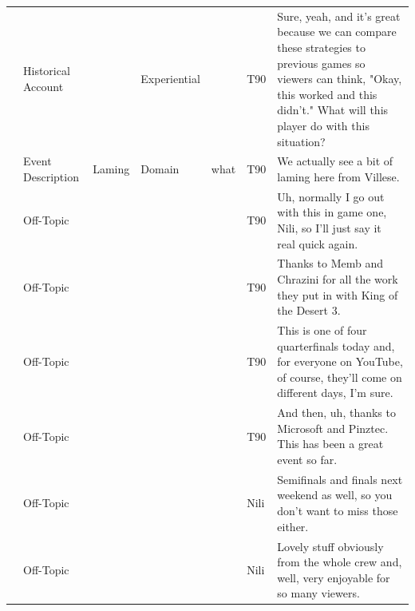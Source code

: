 {\begin{longtable}{@{}>{\theAppRow}r|L{2.3cm}L{2.2cm}L{1.4cm}L{2.2cm}L{0.5cm}U{5.6cm}@{}}
    & Historical Account    &                      & Experiential &                   & T90     & Sure, yeah, and it's great because we can compare these strategies to previous games so viewers can think, "Okay, this worked and this didn't." What will this player do with this situation?                            \\
    & Event Description     & Laming               & Domain      & what              & T90     & We actually see a bit of laming here from Villese.                                                                                                                                                                       \\
    & Off-Topic             &                      &             &                   & T90     & Uh, normally I go out with this in game one, Nili, so I'll just say it real quick again.                                                                                                                                 \\
    & Off-Topic             &                      &             &                   & T90     & Thanks to Memb and Chrazini for all the work they put in with King of the Desert 3.                                                                                                                                      \\
    & Off-Topic             &                      &             &                   & T90     & This is one of four quarterfinals today and, for everyone on YouTube, of course, they'll come on different days, I'm sure.                                                                                               \\
    & Off-Topic             &                      &             &                   & T90     & And then, uh, thanks to Microsoft and Pinztec. This has been a great event so far.                                                                                                                                       \\
    & Off-Topic             &                      &             &                   & Nili    & Semifinals and finals next weekend as well, so you don't want to miss those either.                                                                                                                                      \\
    & Off-Topic             &                      &             &                   & Nili    & Lovely stuff obviously from the whole crew and, well, very enjoyable for so many viewers.                                                                                                                                \\

\end{longtable}}
